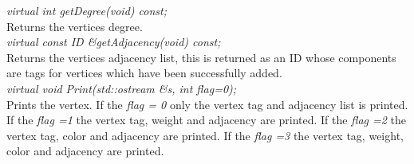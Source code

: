 {\em virtual int getDegree(void) const;} \\
Returns the vertices degree. \\

{\em virtual const ID \&getAdjacency(void) const;} \\
Returns the vertices adjacency list, this is returned as an ID whose
components are tags for vertices which have been successfully added.\\
    
{\em virtual void Print(std::ostream \&s, int flag=0);} \\
Prints the vertex. If the {\em flag = 0} only the vertex tag and
adjacency list is printed. If the {\em flag =1} the vertex tag, weight
and adjacency are printed. If the {\em flag =2} the vertex tag, color
and adjacency are printed. If the {\em flag =3} the vertex tag,
weight, color and adjacency are printed. \\  






